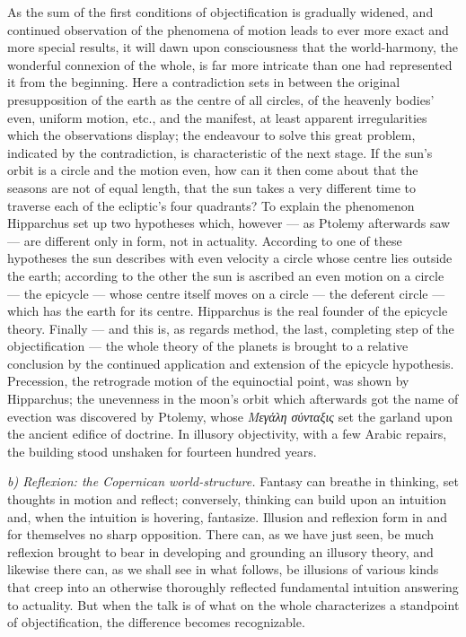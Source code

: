 \documentclass[12pt,a4paper]{book}
\newcommand{\runin}[1]{\emph{#1}\hspace{0.4em}}
\begin{document}
As the sum of the first conditions of objectification is gradually widened, and continued observation of
the phenomena of motion leads to ever more exact and more special results, it will dawn upon consciousness
that the world-harmony, the wonderful connexion of the whole, is far more intricate than one had
represented it from the beginning. Here a contradiction sets in between the original presupposition of the
earth as the centre of all circles, of the heavenly bodies' even, uniform motion, etc., and the manifest,
at least apparent irregularities which the observations display; the endeavour to solve this great problem,
indicated by the contradiction, is characteristic of the next stage. If the sun's orbit is a circle and the
motion even, how can it then come about that the seasons are not of equal length, that the sun takes a very
different time to traverse each of the ecliptic's four quadrants? To explain the phenomenon Hipparchus set
up two hypotheses which, however --- as Ptolemy afterwards saw --- are different only in form, not in
actuality. According to one of these hypotheses the sun describes with even velocity a circle whose centre
lies outside the earth;
according to the other the sun is ascribed an even motion on a circle --- the epicycle --- whose centre
itself moves on a circle --- the deferent circle --- which has the earth for its centre.
Hipparchus is the real founder of the epicycle theory. Finally --- and this is, as regards method, the
last, completing step of the objectification --- the whole theory of the planets is brought to a relative
conclusion by the continued application and extension of the epicycle hypothesis. Precession, the retrograde
motion of the equinoctial point, was shown by Hipparchus; the unevenness in the moon's orbit which
afterwards got the name of evection was discovered by Ptolemy, whose \textit{Μεγάλη σύνταξις} set the
garland upon the ancient edifice of doctrine. In illusory objectivity, with a few Arabic repairs, the
building stood unshaken for fourteen hundred years.

\runin{b) Reflexion: the Copernican world-structure.} Fantasy can breathe in thinking, set thoughts in
motion and reflect; conversely, thinking can build upon an intuition and, when the intuition is hovering,
fantasize. Illusion and reflexion form in and for themselves no sharp opposition. There can, as we have
just seen, be much reflexion brought to bear in developing and grounding an illusory theory, and likewise
there can, as we shall see in what follows, be illusions of various kinds that creep into an otherwise
thoroughly reflected fundamental intuition answering to actuality. But when the talk is of what on the
whole characterizes a standpoint of objectification, the difference becomes recognizable.
\end{document}
